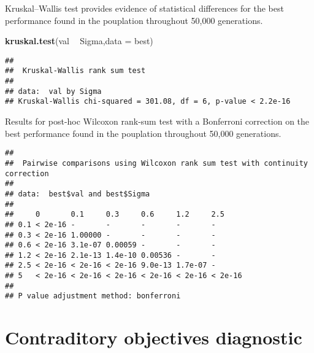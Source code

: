 \documentclass[]{book}
\newenvironment{Shaded}{\begin{snugshade}}{\end{snugshade}}
\newcommand{\DataTypeTok}[1]{\textcolor[rgb]{0.13,0.29,0.53}{#1}}
\newcommand{\KeywordTok}[1]{\textcolor[rgb]{0.13,0.29,0.53}{\textbf{#1}}}
\newcommand{\NormalTok}[1]{#1}
\newcommand{\OperatorTok}[1]{\textcolor[rgb]{0.81,0.36,0.00}{\textbf{#1}}}
\newcommand{\OtherTok}[1]{\textcolor[rgb]{0.56,0.35,0.01}{#1}}
\newcommand{\StringTok}[1]{\textcolor[rgb]{0.31,0.60,0.02}{#1}}
\begin{document}
Kruskal--Wallis test provides evidence of statistical differences for the best performance found in the pouplation throughout 50,000 generations.

\begin{Shaded}
\begin{Highlighting}[]
\KeywordTok{kruskal.test}\NormalTok{(val }\OperatorTok{~}\StringTok{ }\NormalTok{Sigma,}\DataTypeTok{data =}\NormalTok{ best)}
\end{Highlighting}
\end{Shaded}

\begin{verbatim}
## 
##  Kruskal-Wallis rank sum test
## 
## data:  val by Sigma
## Kruskal-Wallis chi-squared = 301.08, df = 6, p-value < 2.2e-16
\end{verbatim}

Results for post-hoc Wilcoxon rank-sum test with a Bonferroni correction on the best performance found in the pouplation throughout 50,000 generations.

\begin{Shaded}
\end{Shaded}

\begin{verbatim}
## 
##  Pairwise comparisons using Wilcoxon rank sum test with continuity correction 
## 
## data:  best$val and best$Sigma 
## 
##     0       0.1     0.3     0.6     1.2     2.5    
## 0.1 < 2e-16 -       -       -       -       -      
## 0.3 < 2e-16 1.00000 -       -       -       -      
## 0.6 < 2e-16 3.1e-07 0.00059 -       -       -      
## 1.2 < 2e-16 2.1e-13 1.4e-10 0.00536 -       -      
## 2.5 < 2e-16 < 2e-16 < 2e-16 9.0e-13 1.7e-07 -      
## 5   < 2e-16 < 2e-16 < 2e-16 < 2e-16 < 2e-16 < 2e-16
## 
## P value adjustment method: bonferroni
\end{verbatim}

\hypertarget{contraditory-objectives-diagnostic-3}{%
\section{Contraditory objectives diagnostic}\label{contraditory-objectives-diagnostic-3}}
\end{document}
